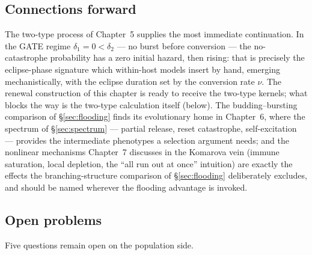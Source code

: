 \subsection{Connections forward}
\label{sec:discussion-forward}

The two-type process of Chapter~5 supplies the most immediate continuation.
In the GATE regime $\delta_1=0<\delta_2$ --- no burst before conversion ---
the no-catastrophe probability has a zero initial hazard, then rising:
that is precisely the eclipse-phase signature which within-host models
insert by hand, emerging mechanistically, with the eclipse duration set by
the conversion rate $\nu$. The renewal construction of this chapter is
ready to receive the two-type kernels; what blocks the way is the two-type
calculation itself (below). The budding--bursting comparison of
\S\ref{sec:flooding} finds its evolutionary home in Chapter~6, where the
spectrum of \S\ref{sec:spectrum} --- partial release, reset catastrophe,
self-excitation --- provides the intermediate phenotypes a selection
argument needs; and the nonlinear mechanisms Chapter~7 discusses in the
Komarova vein (immune saturation, local depletion, the ``all run out at
once'' intuition) are exactly the effects the branching-structure
comparison of \S\ref{sec:flooding} deliberately excludes, and should be
named wherever the flooding advantage is invoked.

\subsection{Open problems}
\label{sec:open-problems}

Five questions remain open on the population side.

